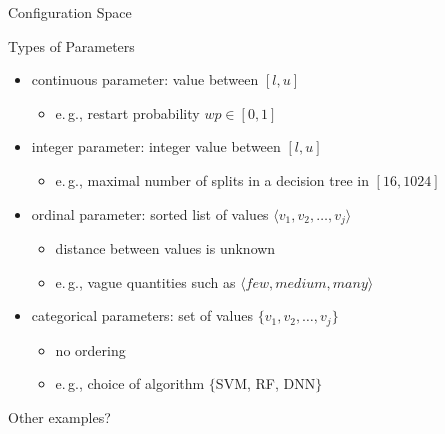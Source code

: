 \begin{frame}[c]{Configuration Space}

\begin{block}{Types of Parameters}
  \begin{itemize}
    \item continuous parameter: value between $[l,u]$
    \begin{itemize}
      \item e.$\,$g., restart probability $wp \in [0,1]$ 
    \end{itemize}
    \pause
    \item integer parameter: integer value between $[l,u]$
    \begin{itemize}
      \item e.$\,$g., maximal number of splits in a decision tree in $[16,1024]$
    \end{itemize}
    \pause
    \item ordinal parameter: sorted list of values $\langle v_1, v_2, \ldots, v_j \rangle$
    \begin{itemize}
      \item distance between values is unknown
      \item e.$\,$g., vague quantities such as $\langle few, medium, many \rangle$
    \end{itemize}
    \pause
    \item categorical parameters: set of values $\{v_1, v_2, \ldots, v_j \}$
    \begin{itemize}
      \item no ordering
      \item e.$\,$g., choice of algorithm $\{$SVM, RF, DNN$\}$
    \end{itemize}
  \end{itemize}
\end{block}

\pause
\bigskip
\hands Other examples?

\end{frame}
